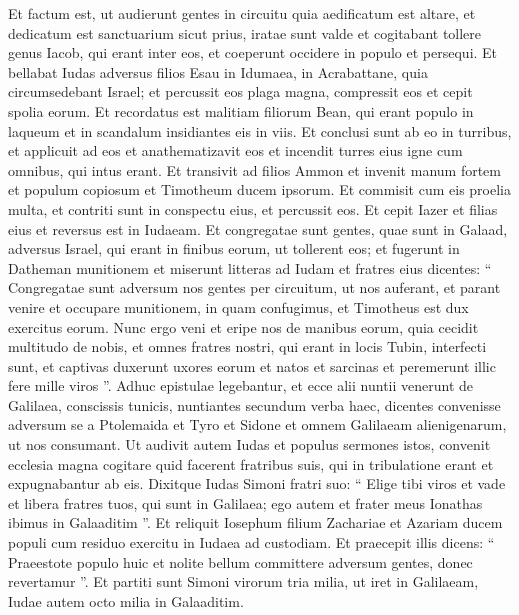 \begin{biblechapter}
\begin{biblechapter}
\begin{biblechapter}
\begin{biblechapter}
\begin{biblechapter}
\verse Et factum est, ut audierunt gentes in circuitu quia aedificatum est altare, et dedicatum est sanctuarium sicut prius, iratae sunt valde 
\verse et cogitabant tollere genus Iacob, qui erant inter eos, et coeperunt occidere in populo et persequi. 
\verse Et bellabat Iudas adversus filios Esau in Idumaea, in Acrabattane, quia circumsedebant Israel; et percussit eos plaga magna, compressit eos et cepit spolia eorum. 
\verse Et recordatus est malitiam filiorum Bean, qui erant populo in laqueum et in scandalum insidiantes eis in viis. 
\verse Et conclusi sunt ab eo in turribus, et applicuit ad eos et anathematizavit eos et incendit turres eius igne cum omnibus, qui intus erant. 
\verse Et transivit ad filios Ammon et invenit manum fortem et populum copiosum et Timotheum ducem ipsorum. 
\verse Et commisit cum eis proelia multa, et contriti sunt in conspectu eius, et percussit eos. 
\verse Et cepit Iazer et filias eius et reversus est in Iudaeam.
 \verse Et congregatae sunt gentes, quae sunt in Galaad, adversus Israel, qui erant in finibus eorum, ut tollerent eos; et fugerunt in Datheman munitionem 
\verse et miserunt litteras ad Iudam et fratres eius dicentes: “ Congregatae sunt adversum nos gentes per circuitum, ut nos auferant, 
\verse et parant venire et occupare munitionem, in quam confugimus, et Timotheus est dux exercitus eorum. 
\verse Nunc ergo veni et eripe nos de manibus eorum, quia cecidit multitudo de nobis, 
\verse et omnes fratres nostri, qui erant in locis Tubin, interfecti sunt, et captivas duxerunt uxores eorum et natos et sarcinas et peremerunt illic fere mille viros ”.
 \verse Adhuc epistulae legebantur, et ecce alii nuntii venerunt de Galilaea, conscissis tunicis, nuntiantes secundum verba haec, 
\verse dicentes convenisse adversum se a Ptolemaida et Tyro et Sidone et omnem Galilaeam alienigenarum, ut nos consumant. 
\verse Ut audivit autem Iudas et populus sermones istos, convenit ecclesia magna cogitare quid facerent fratribus suis, qui in tribulatione erant et expugnabantur ab eis. 
\verse Dixitque Iudas Simoni fratri suo: “ Elige tibi viros et vade et libera fratres tuos, qui sunt in Galilaea; ego autem et frater meus Ionathas ibimus in Galaaditim ”. 
\verse Et reliquit Iosephum filium Zachariae et Azariam ducem populi cum residuo exercitu in Iudaea ad custodiam. 
 \verse Et praecepit illis dicens: “ Praeestote populo huic et nolite bellum committere adversum gentes, donec revertamur ”. 
\verse Et partiti sunt Simoni virorum tria milia, ut iret in Galilaeam, Iudae autem octo milia in Galaaditim. 

\end{biblechapter}
\end{biblechapter}
\end{biblechapter}
\end{biblechapter}
\end{biblechapter}
